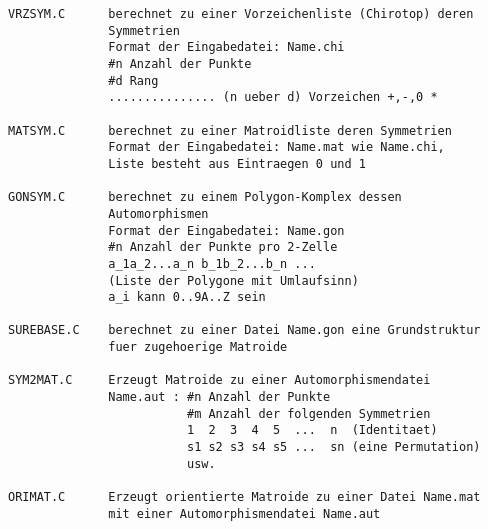 \begin{verbatim}
VRZSYM.C      berechnet zu einer Vorzeichenliste (Chirotop) deren
              Symmetrien
              Format der Eingabedatei: Name.chi
              #n Anzahl der Punkte
              #d Rang
              ............... (n ueber d) Vorzeichen +,-,0 *

MATSYM.C      berechnet zu einer Matroidliste deren Symmetrien
              Format der Eingabedatei: Name.mat wie Name.chi,
              Liste besteht aus Eintraegen 0 und 1

GONSYM.C      berechnet zu einem Polygon-Komplex dessen
              Automorphismen
              Format der Eingabedatei: Name.gon
              #n Anzahl der Punkte pro 2-Zelle
              a_1a_2...a_n b_1b_2...b_n ...
              (Liste der Polygone mit Umlaufsinn)
              a_i kann 0..9A..Z sein

SUREBASE.C    berechnet zu einer Datei Name.gon eine Grundstruktur
              fuer zugehoerige Matroide

SYM2MAT.C     Erzeugt Matroide zu einer Automorphismendatei
              Name.aut : #n Anzahl der Punkte
                         #m Anzahl der folgenden Symmetrien
                         1  2  3  4  5  ...  n  (Identitaet)
                         s1 s2 s3 s4 s5 ...  sn (eine Permutation)
                         usw.

ORIMAT.C      Erzeugt orientierte Matroide zu einer Datei Name.mat
              mit einer Automorphismendatei Name.aut
\end{verbatim}
